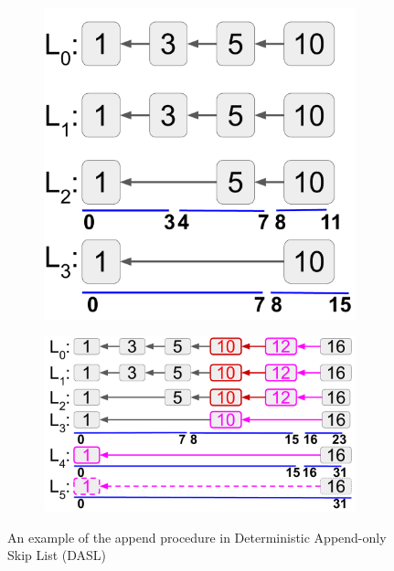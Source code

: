 \begin{figure}
  \centering
  \begin{subfigure}{0.32\textwidth}
    \includegraphics[width=0.99\textwidth]{diagram/provenance/dasl_original.pdf}
    \caption{}
    \label{diagram:prov:dasl_original}
  \end{subfigure}
  \begin{subfigure}{0.54\textwidth}
    \includegraphics[width=0.99\textwidth]{diagram/provenance/dasl_appended.pdf}
    \caption{}
    \label{diagram:prov:dasl_appended}
  \end{subfigure}
  \caption{An example of the append procedure in Deterministic Append-only Skip List (DASL)}
\end{figure}

